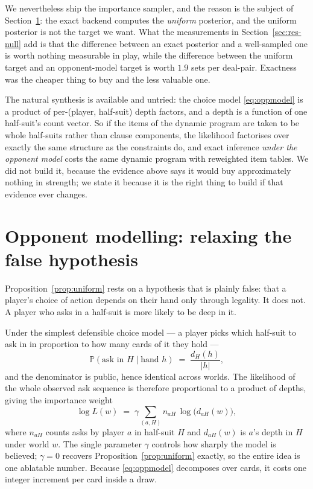 \documentclass[11pt,a4paper]{article}
\newcommand{\halfsuit}{\ensuremath{H}}
\newcommand{\Prob}{\ensuremath{\mathbb{P}}}
\begin{document}
We nevertheless ship the importance sampler, and the reason is the subject of
Section~\ref{sec:oppmodel}: the exact backend computes the \emph{uniform}
posterior, and the uniform posterior is not the target we want. What the
measurements in Section~\ref{sec:res-null} add is that the difference between an
exact posterior and a well-sampled one is worth nothing measurable in play,
while the difference between the uniform target and an opponent-model target is
worth $1.9$ sets per deal-pair. Exactness was the cheaper thing to buy and the
less valuable one.

The natural synthesis is available and untried: the choice model
\eqref{eq:oppmodel} is a product of per-(player, half-suit) depth factors, and a
depth is a function of one half-suit's count vector. So if the items of the
dynamic program are taken to be whole half-suits rather than clause components,
the likelihood factorises over exactly the same structure as the constraints do,
and exact inference \emph{under the opponent model} costs the same dynamic
program with reweighted item tables. We did not build it, because the evidence
above says it would buy approximately nothing in strength; we state it because
it is the right thing to build if that evidence ever changes.

\section{Opponent modelling: relaxing the false hypothesis}
\label{sec:oppmodel}

Proposition~\ref{prop:uniform} rests on a hypothesis that is plainly false:
that a player's choice of action depends on their hand only through legality.
It does not. A player who asks in a half-suit is more likely to be deep in it.

Under the simplest defensible choice model --- a player picks which half-suit
to ask in in proportion to how many cards of it they hold ---
\begin{equation}
\Prob(\text{ask in } \halfsuit \mid \text{hand } h)
\;=\; \frac{d_\halfsuit(h)}{|h|},
\label{eq:choice}
\end{equation}
and the denominator is public, hence identical across worlds. The likelihood of
the whole observed ask sequence is therefore proportional to a product of
depths, giving the importance weight
\begin{equation}
\log L(w) \;=\; \gamma \sum_{(a,\halfsuit)} n_{a\halfsuit} \,
\log\big( d_{a\halfsuit}(w) \big),
\label{eq:oppmodel}
\end{equation}
where $n_{a\halfsuit}$ counts asks by player $a$ in half-suit $\halfsuit$ and
$d_{a\halfsuit}(w)$ is $a$'s depth in $\halfsuit$ under world $w$. The single
parameter $\gamma$ controls how sharply the model is believed;
$\gamma = 0$ recovers Proposition~\ref{prop:uniform} exactly, so the entire
idea is one ablatable number. Because \eqref{eq:oppmodel} decomposes over
cards, it costs one integer increment per card inside a draw.
\end{document}
